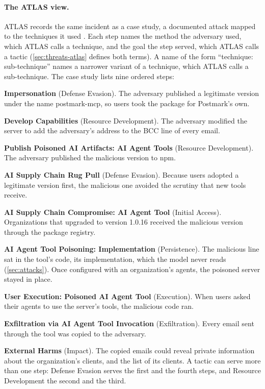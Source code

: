 \paragraph{The ATLAS view.} ATLAS records the same incident as a case study, a documented attack
mapped to the techniques it used \citep{atlas-cs0053-postmark}. Each step names the method the
adversary used, which ATLAS calls a technique, and the goal the step served, which ATLAS calls a
tactic (\cref{sec:threats-atlas} defines both terms). A name of the form ``technique:
sub-technique'' names a narrower variant of a technique, which ATLAS calls a sub-technique. The
case study lists nine ordered steps:
\be
\item \textbf{Impersonation} (Defense Evasion). The adversary published a legitimate version under
the name postmark-mcp, so users took the package for Postmark's own.
\item \textbf{Develop Capabilities} (Resource Development). The adversary modified the server to add
the adversary's address to the BCC line of every email.
\item \textbf{Publish Poisoned AI Artifacts: AI Agent Tools} (Resource Development). The adversary
published the malicious version to npm.
\item \textbf{AI Supply Chain Rug Pull} (Defense Evasion). Because users adopted a legitimate
version first, the malicious one avoided the scrutiny that new tools receive.
\item \textbf{AI Supply Chain Compromise: AI Agent Tool} (Initial Access). Organizations that
upgraded to version 1.0.16 received the malicious version through the package registry.
\item \textbf{AI Agent Tool Poisoning: Implementation} (Persistence). The malicious line sat in the
tool's code, its implementation, which the model never reads (\cref{sec:attacks}). Once configured
with an organization's agents, the poisoned server stayed in place.
\item \textbf{User Execution: Poisoned AI Agent Tool} (Execution). When users asked their agents to
use the server's tools, the malicious code ran.
\item \textbf{Exfiltration via AI Agent Tool Invocation} (Exfiltration). Every email sent through
the tool was copied to the adversary.
\item \textbf{External Harms} (Impact). The copied emails could reveal private information about the
organization's clients, and the list of its clients.
\ee
A tactic can serve more than one step: Defense Evasion serves the first and the fourth steps, and
Resource Development the second and the third.

